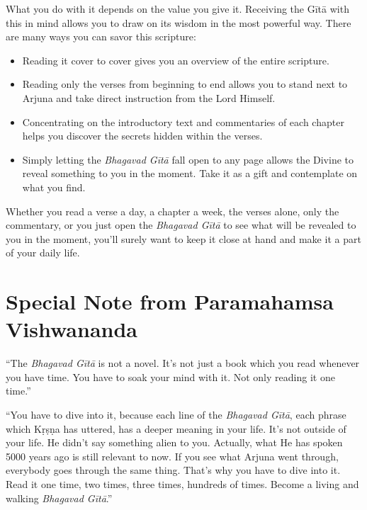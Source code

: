 What you do with it depends on the value you give it. Receiving the Gītā with this in mind allows you to draw on its wisdom in the most powerful way. There are many ways you can savor this scripture: 

\begin{itemize}[itemsep=1pt, topsep=6pt]

\item Reading it cover to cover gives you an overview of the entire scripture. 

\item Reading only the verses from beginning to end allows you to stand next to Arjuna and take direct instruction from the Lord Himself. 

\item Concentrating on the introductory text and commentaries of each chapter helps you discover the secrets hidden within the verses. 

\item Simply letting the \textit{Bhagavad Gītā} fall open to any page allows the Divine to reveal something to you in the moment. Take it as a gift and contemplate on what you find. 

\end{itemize}

Whether you read a verse a day, a chapter a week, the verses alone, only the commentary, or you just open the \textit{Bhagavad Gītā} to see what will be revealed to you in the moment, you’ll surely want to keep it close at hand and make it a part of your daily life.

\section{Special Note from Paramahamsa \\ Vishwananda}\label{sec-special-note-from-paramahamsa-vishwananda}

\enquote{The \textit{Bhagavad Gītā} is not a novel. It's not just a book which you read whenever you have time. You have to soak your mind with it. Not only reading it one time.}

\enquote{You have to dive into it, because each line of the \textit{Bhagavad Gītā}, each phrase which Kṛṣṇa has uttered, has a deeper meaning in your life. It’s not outside of your life. He didn’t say something alien to you. Actually, what He has spoken 5000 years ago is still relevant to now. If you see what Arjuna went through, everybody goes through the same thing. That’s why you have to dive into it. Read it one time, two times, three times, hundreds of times. Become a living and walking \textit{Bhagavad Gītā}.}